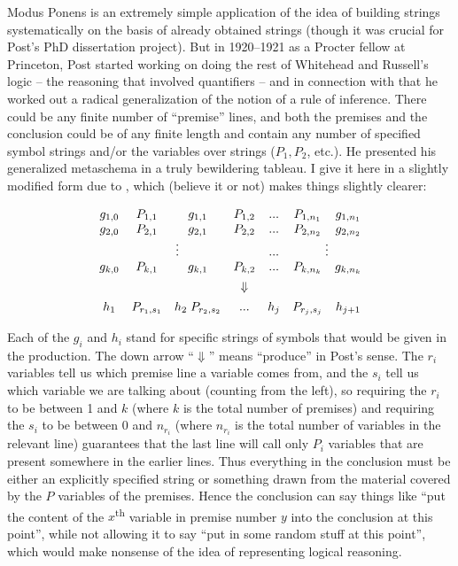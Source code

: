 \documentclass[output=paper]{langscibook}
\begin{document}
Modus Ponens is an extremely simple application of the idea of building strings systematically on the basis of already obtained strings (though it was crucial for Post's PhD dissertation project). But in 1920--1921 as a Procter fellow at Princeton, Post started working on doing the rest of Whitehead and Russell's logic -- the reasoning that involved quantifiers -- and in connection with that he worked out a radical generalization of the notion of a rule of inference. There could be any finite number of ``premise'' lines, and both the premises and the conclusion could be of any finite length and contain any number of specified symbol strings and/or the variables over strings ($P_1, P_2$, etc.). He presented his generalized metaschema in a truly bewildering tableau. I give it here in a slightly modified form due to \citet{Davis82}, which (believe it or not) makes things slightly clearer:

\large
\begin{displaymath}
\begin{array}{ccccccc} g_{1,0} & P_{1,1} & g_{1,1} & P_{1,2}  & . . . & P_{1,n_1} & g_{1,n_1} \\ g_{2,0} & P_{2,1} & g_{2,1} & P_{2,2}  & . . . & P_{2,n_2} & g_{2,n_2} \\ \multicolumn{4}{c}{\vdots}             & . . . & \multicolumn{2}{c}{\vdots} \\ g_{k,0} & P_{k,1} & g_{k,1} & P_{k,2}  & . . . & P_{k,n_k} & g_{k,n_k}\\[1ex]         &         &         &\Downarrow&       &           & \\[1ex] h_1 & P_{r_1,s_1} & h_2 \; P_{r_2,s_2} & . . . & h_j & P_{r_j,s_j} & h_{j+1} \end{array} \end{displaymath}

\normalsize\smallskip\noindent  Each of the $g_i$ and $h_i$ stand for specific strings of symbols that would be given in the production. The down arrow ``$\Downarrow$'' means ``produce'' in Post's sense. The $r_i$ variables tell us which premise line a variable comes from, and the $s_i$ tell us which variable we are talking about (counting from the left), so requiring the $r_i$ to be between 1 and $k$ (where $k$ is the total number of premises) and requiring the $s_i$ to be between 0 and $n_{r_i}$ (where $n_{r_i}$ is the total number of variables in the relevant line) guarantees that the last line will call only $P_i$ variables that are present somewhere in the earlier lines. Thus everything in the conclusion must be either an explicitly specified string or something drawn from the material covered by the $P$ variables of the premises. Hence the conclusion can say things like ``put the content of the $x$\textsuperscript{th} variable in premise number $y$ into the conclusion at this point'', while not allowing it to say ``put in some random stuff at this point'', which would make nonsense of the idea of representing logical reasoning.
\end{document}
